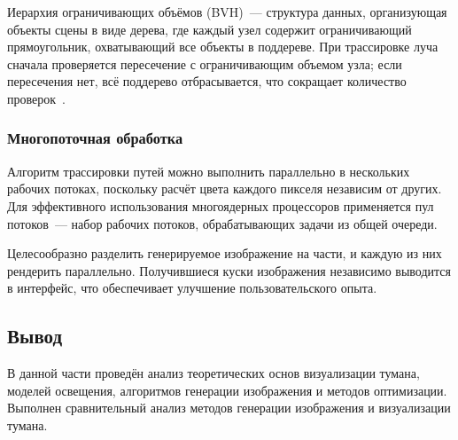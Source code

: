 Иерархия ограничивающих объёмов (BVH)~--- структура данных, организующая объекты сцены в виде дерева, где каждый узел содержит ограничивающий прямоугольник, охватывающий все объекты в поддереве.
При трассировке луча сначала проверяется пересечение с ограничивающим объемом узла; если пересечения нет, всё поддерево отбрасывается, что сокращает количество проверок~\cite{fog-article}.

\subsubsection{Многопоточная обработка}

Алгоритм трассировки путей можно выполнить параллельно в нескольких рабочих потоках,
поскольку расчёт цвета каждого пикселя независим от других.
Для эффективного использования многоядерных процессоров применяется пул потоков~---
набор рабочих потоков, обрабатывающих задачи из общей очереди.

Целесообразно разделить генерируемое изображение на части, и каждую из них рендерить параллельно.
Получившиеся куски изображения независимо выводится в интерфейс, что обеспечивает улучшение пользовательского опыта.

\subsection*{Вывод}

В данной части проведён анализ теоретических основ визуализации тумана, моделей освещения, алгоритмов генерации изображения и методов оптимизации.
Выполнен сравнительный анализ методов генерации изображения и визуализации тумана.
\clearpage
